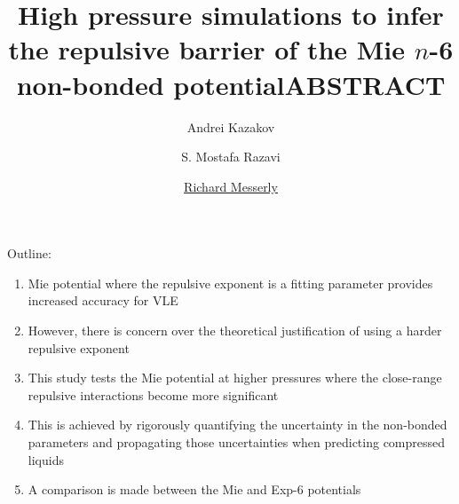 \documentclass[11pt,a4paper]{article}
\begin{document}
	\thispagestyle{empty}
	\title{\Large \textbf{High pressure simulations to infer the repulsive barrier of the Mie $n$-6 non-bonded potential}}
	\author[1]{\large {Andrei Kazakov}}
	\author[3]{\large {S. Mostafa Razavi}}
	\author[1]{\large {\underline{Richard Messerly}}}%
	
	
	
	\date{} %
	\maketitle\thispagestyle{empty} %
	\begin{center}
		\title{\textbf{ABSTRACT}}\centering{}
	\end{center}
	\justify
	
	
	
	Outline:
	\begin{enumerate}
		\item Mie potential where the repulsive exponent is a fitting parameter provides increased accuracy for VLE
		\item However, there is concern over the theoretical justification of using a harder repulsive exponent
		\item This study tests the Mie potential at higher pressures where the close-range repulsive interactions become more significant
		\item This is achieved by rigorously quantifying the uncertainty in the non-bonded parameters and propagating those uncertainties when predicting compressed liquids 
		\item A comparison is made between the Mie and Exp-6 potentials
	\end{enumerate}
	
\end{document}

